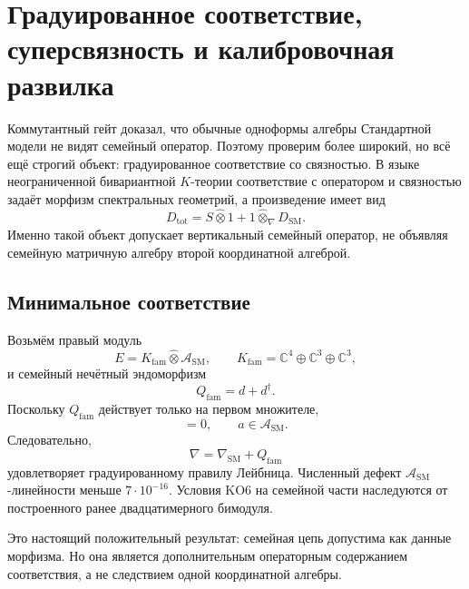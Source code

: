 \chapter{Градуированное соответствие, суперсвязность и калибровочная развилка}

Коммутантный гейт доказал, что обычные одноформы алгебры Стандартной модели
не видят семейный оператор. Поэтому проверим более широкий, но всё ещё
строгий объект: градуированное соответствие со связностью. В языке
неограниченной бивариантной $K$-теории соответствие с оператором и
связностью задаёт морфизм спектральных геометрий, а произведение имеет вид
\begin{equation}
 D_{\mathrm{tot}}
 =S\widehat\otimes1+1\widehat\otimes_{\nabla}D_{\mathrm{SM}}.
 \label{eq:v5-correspondence-product}
\end{equation}
Именно такой объект допускает вертикальный семейный оператор, не объявляя
семейную матричную алгебру второй координатной алгеброй.

\section{Минимальное соответствие}

Возьмём правый модуль
\begin{equation}
 E=K_{\mathrm{fam}}\widehat\otimes\mathcal A_{\mathrm{SM}},
 \qquad
 K_{\mathrm{fam}}=\mathbb C^4\oplus\mathbb C^3\oplus\mathbb C^3,
\end{equation}
и семейный нечётный эндоморфизм
\begin{equation}
 Q_{\mathrm{fam}}=d+d^\dagger.
\end{equation}
Поскольку $Q_{\mathrm{fam}}$ действует только на первом множителе,
\begin{equation}
 [Q_{\mathrm{fam}},R(a)]=0,
 \qquad a\in\mathcal A_{\mathrm{SM}}.
\end{equation}
Следовательно,
\begin{equation}
 \nabla=\nabla_{\mathrm{SM}}+Q_{\mathrm{fam}}
\end{equation}
удовлетворяет градуированному правилу Лейбница. Численный дефект
$\mathcal A_{\mathrm{SM}}$-линейности меньше $7\cdot10^{-16}$. Условия KO6
на семейной части наследуются от построенного ранее двадцатимерного
бимодуля.

Это настоящий положительный результат: семейная цепь допустима как данные
морфизма. Но она является дополнительным операторным содержанием
соответствия, а не следствием одной координатной алгебры.

